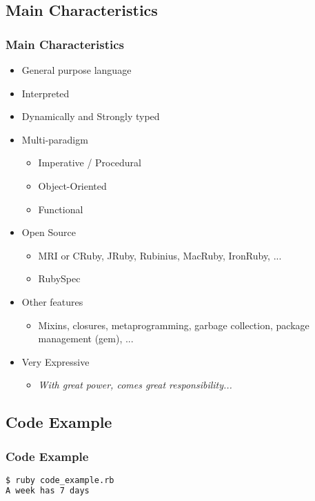 \subsection{Main Characteristics}
\begin{frame}\frametitle{Main Characteristics}

\begin{itemize}

\item<1-> General purpose language

\item<2-> Interpreted

\item<3-> Dynamically and Strongly typed

\item<4-> Multi-paradigm
\begin{itemize}
\item Imperative / Procedural
\item Object-Oriented
\item Functional
\end{itemize}

\item<5-> Open Source
\begin{itemize}
\item MRI or CRuby, JRuby, Rubinius, MacRuby, IronRuby, ...
\item RubySpec
\end{itemize}

\item<6-> Other features
\begin{itemize}
\item Mixins, closures, metaprogramming, garbage collection, package management (gem), ...
\end{itemize}

\item<7-> Very Expressive
\begin{itemize}
\item \textit{With great power, comes great responsibility...}
\end{itemize}


\end{itemize}

\end{frame}


\subsection{Code Example}
\begin{frame}[fragile]\frametitle{Code Example}


\pause
\begin{lstlisting}[language=bash,numbers=none]
$ ruby code_example.rb
A week has 7 days
\end{lstlisting}

\end{frame}


